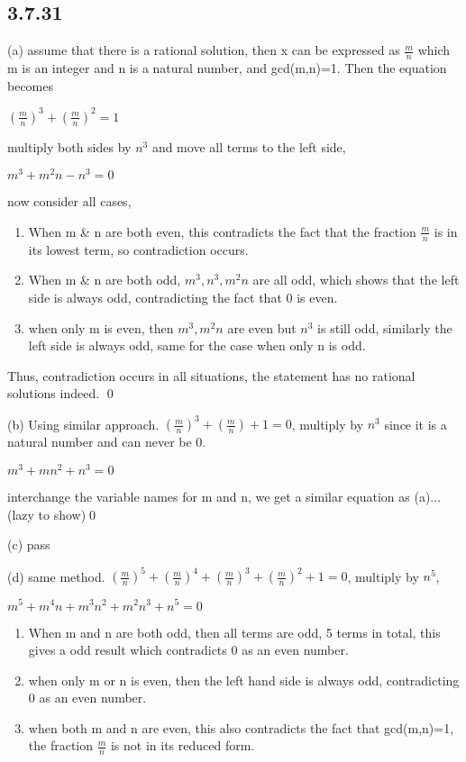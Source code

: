 \documentclass{article}
\begin{document}
\subsection*{3.7.31}

(a) assume that there is a rational solution, then x can be expressed as $\frac{m}{n}$ which m is an integer and n is a natural number, and gcd(m,n)=1. Then the equation becomes

$(\frac{m}{n})^3+(\frac{m}{n})^2=1$

multiply both sides by $n^3$ and move all terms to the left side,

$m^3+m^2n-n^3=0$

now consider all cases,

\begin{enumerate}
    \item When m \& n are both even, this contradicts the fact that the fraction $\frac{m}{n}$ is in its lowest term, so contradiction occurs. 
    \item When m \& n are both odd, $m^3, n^3, m^2n$ are all odd, which shows that the left side is always odd, contradicting the fact that 0 is even.
    \item when only m is even, then $m^3, m^2n$ are even but $n^3$ is still odd, similarly the left side is always odd, same for the case when only n is odd.
\end{enumerate}

Thus, contradiction occurs in all situations, the statement has no rational solutions indeed. \qed

(b) Using similar approach. $(\frac{m}{n})^3+(\frac{m}{n})+1=0$, multiply by $n^3$ since it is a natural number and can never be 0.


$m^3+mn^2+n^3=0$

interchange the variable names for m and n, we get a similar equation as (a)... (lazy to show)\qed

(c) pass

(d) same method. $(\frac{m}{n})^5+(\frac{m}{n})^4+(\frac{m}{n})^3+(\frac{m}{n})^2+1=0$, multiply by $n^5$,

$m^5+m^4n+m^3n^2+m^2n^3+n^5=0$

\begin{enumerate}
    \item When m and n are both odd, then all terms are odd, 5 terms in total, this gives a odd result which contradicts 0 as an even number.
    \item when only m or n is even, then the left hand side is always odd, contradicting 0 as an even number.
    \item when both m and n are even, this also contradicts the fact that gcd(m,n)=1, the fraction $\frac{m}{n}$ is not in its reduced form.
\end{enumerate}
\end{document}
